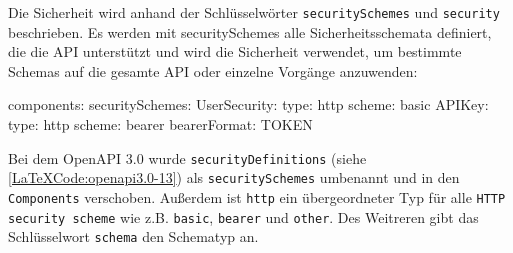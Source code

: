 Die Sicherheit wird anhand der Schlüsselwörter \texttt{securitySchemes} und \texttt{security} beschrieben. Es werden mit securitySchemes alle Sicherheitsschemata definiert, die die API unterstützt und wird die Sicherheit verwendet, um bestimmte Schemas auf die gesamte API oder einzelne Vorgänge anzuwenden\cite{openapisecurity17}: 

\begin{LaTeXCode}[caption={OpenAPI 3.0 - Security},captionpos=b, label=LaTeXCode:openapi3.0-13][numbers=none]
components:  
	securitySchemes:
		UserSecurity:
		  type: http
		  scheme: basic
		APIKey:
		  type: http
		  scheme: bearer
		  bearerFormat: TOKEN
\end{LaTeXCode}

Bei dem OpenAPI 3.0 wurde \texttt{securityDefinitions} (siehe \ref{LaTeXCode:openapi3.0-13}) als \texttt{securitySchemes} umbenannt und in den \texttt{Components} verschoben. Außerdem ist \texttt{http} ein übergeordneter Typ für alle \texttt{HTTP security scheme} wie z.B. \texttt{basic}, \texttt{bearer} und \texttt{other}. Des Weitreren gibt das Schlüsselwort \texttt{schema} den Schematyp an.






















